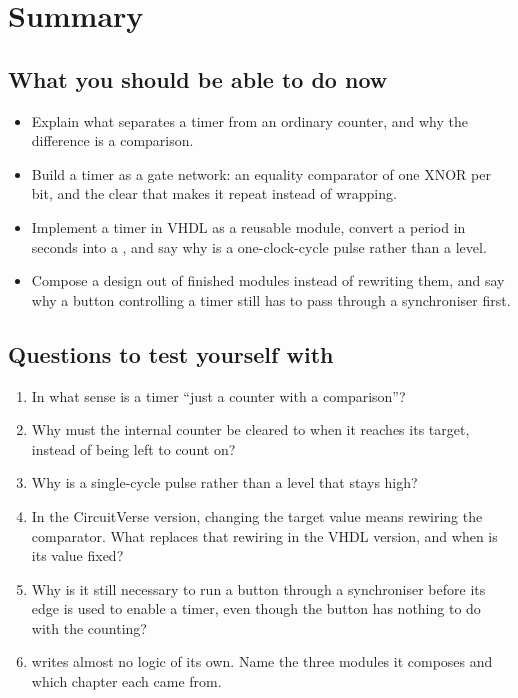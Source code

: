 
\section{Summary}
\label{c7:sec:review}

\subsection*{What you should be able to do now}
\begin{itemize}
  \item Explain what separates a timer from an ordinary counter, and why the difference is a
    comparison.
  \item Build a timer as a gate network: an equality comparator of one XNOR per bit, and the clear
    that makes it repeat instead of wrapping.
  \item Implement a timer in VHDL as a reusable module, convert a period in seconds into a
    , and say why  is a one-clock-cycle pulse rather than a level.
  \item Compose a design out of finished modules instead of rewriting them, and say why a button
    controlling a timer still has to pass through a synchroniser first.
\end{itemize}

\subsection*{Questions to test yourself with}
\begin{enumerate}
  \item In what sense is a timer ``just a counter with a comparison''?
  \item Why must the internal counter be cleared to  when it reaches its target, instead of
    being left to count on?
  \item Why is  a single-cycle pulse rather than a level that stays high?
  \item In the CircuitVerse version, changing the target value means rewiring the comparator. What
    replaces that rewiring in the VHDL version, and when is its value fixed?
  \item Why is it still necessary to run a button through a synchroniser before its edge is used to
    enable a timer, even though the button has nothing to do with the counting?
  \item {} writes almost no logic of its own. Name the three modules it composes and
    which chapter each came from.
\end{enumerate}

